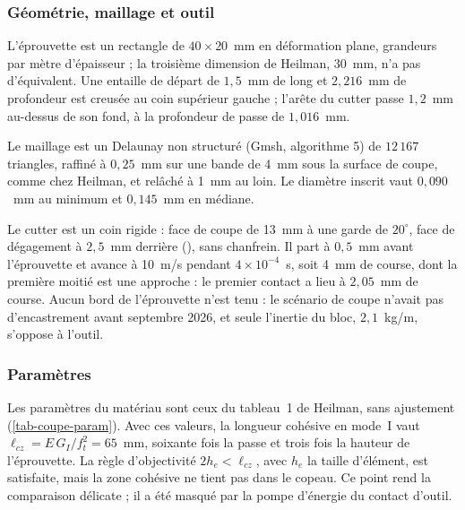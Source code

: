 \subsubsection{Géométrie, maillage et outil}

L'éprouvette est un rectangle de $40 \times 20$~mm en déformation plane, grandeurs par mètre d'épaisseur ; la troisième dimension de Heilman, 30~mm, n'a pas d'équivalent. Une entaille de départ de $1{,}5$~mm de long et $2{,}216$~mm de profondeur est creusée au coin supérieur gauche ; l'arête du cutter passe $1{,}2$~mm au-dessus de son fond, à la profondeur de passe de $1{,}016$~mm.

Le maillage est un Delaunay non structuré (Gmsh, algorithme 5) de $12\,167$ triangles, raffiné à $0{,}25$~mm sur une bande de 4~mm sous la surface de coupe, comme chez Heilman, et relâché à 1~mm au loin. Le diamètre inscrit vaut $0{,}090$~mm au minimum et $0{,}145$~mm en médiane.

Le cutter est un coin rigide : face de coupe de 13~mm à une garde de $20^\circ$, face de dégagement à $2{,}5$~mm derrière (), sans chanfrein. Il part à $0{,}5$~mm avant l'éprouvette et avance à 10~m/s pendant $4\times10^{-4}$~s, soit 4~mm de course, dont la première moitié est une approche : le premier contact a lieu à $2{,}05$~mm de course. Aucun bord de l'éprouvette n'est tenu : le scénario de coupe n'avait pas d'encastrement avant septembre 2026, et seule l'inertie du bloc, $2{,}1$~kg/m, s'oppose à l'outil.

\subsubsection{Paramètres}

Les paramètres du matériau sont ceux du tableau~1 de Heilman, sans ajustement (\cref{tab-coupe-param}). Avec ces valeurs, la longueur cohésive en mode~I vaut $\ell_{cz} = E\,G_I/f_t^2 = 65$~mm, soixante fois la passe et trois fois la hauteur de l'éprouvette. La règle d'objectivité $2h_e < \ell_{cz}$, avec $h_e$ la taille d'élément, est satisfaite, mais la zone cohésive ne tient pas dans le copeau. Ce point rend la comparaison délicate ; il a été masqué par la pompe d'énergie du contact d'outil.

